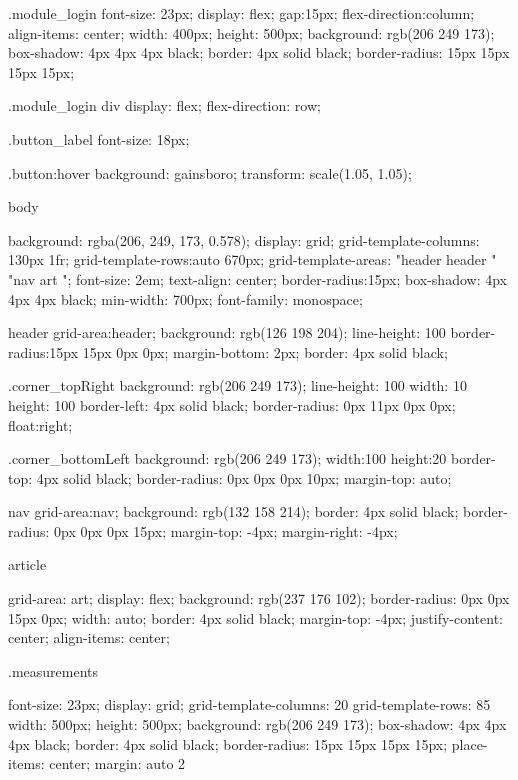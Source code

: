 \documentclass[12pt]{article} %
\begin{document}
\begin{htmlcode}[caption={CSS Stlye Sheet}]
.module_login
{
   font-size: 23px;
   display: flex;
   gap:15px;
   flex-direction:column;
   align-items: center;
   width: 400px;
   height: 500px;
   background: rgb(206 249 173);
   box-shadow: 4px 4px 4px black;
   border: 4px solid black;
   border-radius: 15px 15px 15px 15px;
}
    
.module_login div 
{
   display: flex;
   flex-direction: row;       
}
    
 .button_label
{
   font-size: 18px;
}
    
.button:hover
{
   background: gainsboro;
   transform: scale(1.05, 1.05);
}
    
body
{
  
   background: rgba(206, 249, 173, 0.578);
   display: grid;
   grid-template-columns: 130px 1fr;
   grid-template-rows:auto 670px;
   grid-template-areas: 
   "header header "
   "nav art ";
   font-size: 2em;
   text-align: center;
   border-radius:15px;
   box-shadow: 4px 4px 4px black;
   min-width: 700px;
   font-family: monospace;
}
    
    
header 
{
   grid-area:header;
   background: rgb(126 198 204);
   line-height: 100%
   border-radius:15px 15px 0px 0px;
   margin-bottom: 2px;
   border: 4px solid black;
}
    
.corner_topRight
{
   background: rgb(206 249 173);
   line-height: 100%
   width: 10%
   height: 100%
   border-left: 4px solid black;
   border-radius: 0px 11px 0px 0px;
   float:right;
}
    
.corner_bottomLeft
{
   background: rgb(206 249 173);
   width:100%
   height:20%
   border-top: 4px solid black;
   border-radius: 0px 0px 0px 10px;
   margin-top: auto;       
}
    
nav 
{
   grid-area:nav;
   background: rgb(132 158 214);
   border: 4px solid black;
   border-radius: 0px 0px 0px 15px;
   margin-top: -4px;
   margin-right: -4px;    
}
     
article
{
   grid-area: art;
   display: flex;
   background: rgb(237 176 102);
   border-radius: 0px 0px 15px 0px;
   width: auto;
   border: 4px solid black;
   margin-top: -4px;
   justify-content: center;
   align-items: center;
    
}


.measurements
{
   font-size: 23px;
   display: grid;
   grid-template-columns: 20%
   grid-template-rows: 85%
   width: 500px;
   height: 500px;
   background: rgb(206 249 173);
   box-shadow: 4px 4px 4px black;
   border: 4px solid black;
   border-radius: 15px 15px 15px 15px;
   place-items: center;
   margin: auto 2%

}
\end{htmlcode}
\end{document}

